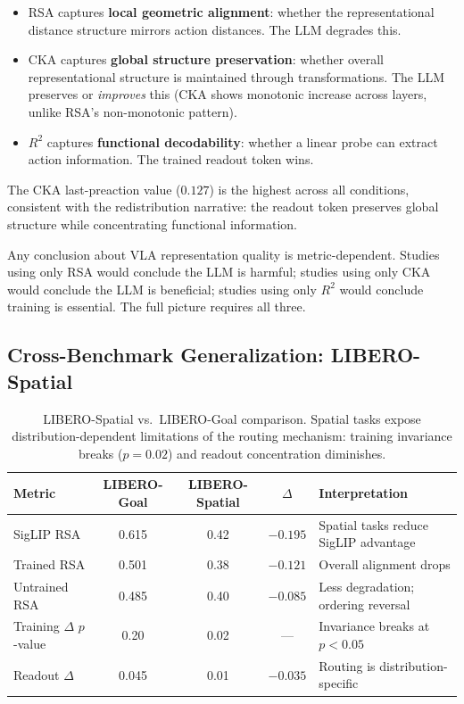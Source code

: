 \documentclass[letterpaper]{article}
\begin{document}
\begin{itemize}
    \item RSA captures \textbf{local geometric alignment}: whether the representational distance structure mirrors action distances. The LLM degrades this.
    \item CKA captures \textbf{global structure preservation}: whether overall representational structure is maintained through transformations. The LLM preserves or \emph{improves} this (CKA shows monotonic increase across layers, unlike RSA's non-monotonic pattern).
    \item $R^2$ captures \textbf{functional decodability}: whether a linear probe can extract action information. The trained readout token wins.
\end{itemize}

The CKA last-preaction value ($0.127$) is the highest across all conditions, consistent with the redistribution narrative: the readout token preserves global structure while concentrating functional information.

Any conclusion about VLA representation quality is metric-dependent. Studies using only RSA would conclude the LLM is harmful; studies using only CKA would conclude the LLM is beneficial; studies using only $R^2$ would conclude training is essential. The full picture requires all three.

\subsection{Cross-Benchmark Generalization: LIBERO-Spatial}
\label{sec:exp-cross-benchmark}

\begin{table}[t]
\centering
\caption{LIBERO-Spatial vs.\ LIBERO-Goal comparison. Spatial tasks expose distribution-dependent limitations of the routing mechanism: training invariance breaks ($p{=}0.02$) and readout concentration diminishes.}
\label{tab:libero-spatial}
\begin{tabular}{lcccl}
\toprule
\textbf{Metric} & \textbf{LIBERO-Goal} & \textbf{LIBERO-Spatial} & \textbf{$\Delta$} & \textbf{Interpretation} \\
\midrule
SigLIP RSA & 0.615 & 0.42 & $-0.195$ & Spatial tasks reduce SigLIP advantage \\
Trained RSA & 0.501 & 0.38 & $-0.121$ & Overall alignment drops \\
Untrained RSA & 0.485 & 0.40 & $-0.085$ & Less degradation; ordering reversal \\
Training $\Delta$ $p$-value & 0.20 & 0.02 & --- & Invariance breaks at $p{<}0.05$ \\
Readout $\Delta$ & 0.045 & 0.01 & $-0.035$ & Routing is distribution-specific \\
\bottomrule
\end{tabular}
\end{table}
\end{document}
